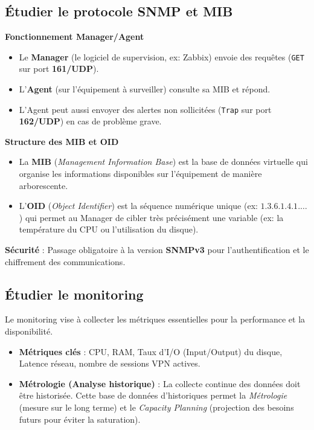 \subsection*{Étudier le protocole SNMP et MIB}
{}

\noindent \textbf{Fonctionnement Manager/Agent}

\begin{itemize}
    \item Le \textbf{Manager} (le logiciel de supervision, ex: Zabbix) envoie des requêtes (\texttt{GET} sur port \textbf{161/UDP}).
    \item L'\textbf{Agent} (sur l'équipement à surveiller) consulte sa MIB et répond.
    \item L'Agent peut aussi envoyer des alertes non sollicitées (\texttt{Trap} sur port \textbf{162/UDP}) en cas de problème grave.
\end{itemize}

\newpage

\noindent \textbf{Structure des MIB et OID}
\begin{itemize}
    \item La \textbf{MIB} (\textit{Management Information Base}) est la base de données virtuelle qui organise les informations disponibles sur l'équipement de manière arborescente.
    \item L'\textbf{OID} (\textit{Object Identifier}) est la séquence numérique unique (ex: $1.3.6.1.4.1.\dots$) qui permet au Manager de cibler très précisément une variable (ex: la température du CPU ou l'utilisation du disque).
\end{itemize}
\vspace{0.5em}
\noindent \textbf{Sécurité} : Passage obligatoire à la version \textbf{SNMPv3} pour l'authentification et le chiffrement des communications.

\subsection*{Étudier le monitoring}
{}

\noindent Le monitoring vise à collecter les métriques essentielles pour la performance et la disponibilité.
\begin{itemize}
    \item \textbf{Métriques clés} : CPU, RAM, Taux d'I/O (Input/Output) du disque, Latence réseau, nombre de sessions VPN actives.
    \item \textbf{Métrologie (Analyse historique)} : La collecte continue des données doit être historisée. Cette base de données d'historiques permet la \textit{Métrologie} (mesure sur le long terme) et le \textit{Capacity Planning} (projection des besoins futurs pour éviter la saturation).
\end{itemize}

